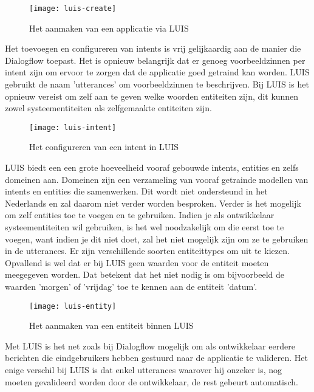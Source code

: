 \begin{figure}[H]
    \label{fig:luis-create}
    \centering
    \texttt{[image: luis-create]}
    \caption{Het aanmaken van een applicatie via LUIS}
\end{figure}

Het toevoegen en configureren van intents is vrij gelijkaardig aan de manier die Dialogflow toepast. Het is opnieuw belangrijk dat er genoeg voorbeeldzinnen per intent zijn om ervoor te zorgen dat de applicatie goed getraind kan worden. LUIS gebruikt de naam 'utterances' om voorbeeldzinnen te beschrijven. Bij LUIS is het opnieuw vereist om zelf aan te geven welke woorden entiteiten zijn, dit kunnen zowel systeementiteiten als zelfgemaakte entiteiten zijn.

\begin{figure}[H]
    \label{fig:luis-intent}
    \centering
    \texttt{[image: luis-intent]}
    \caption{Het configureren van een intent in LUIS}
\end{figure}

LUIS biedt een een grote hoeveelheid vooraf gebouwde intents, entities en zelfs domeinen aan. Domeinen zijn een verzameling van vooraf getrainde modellen van intents en entities die samenwerken. Dit wordt niet ondersteund in het Nederlands en zal daarom niet verder worden besproken. Verder is het mogelijk om zelf entities toe te voegen en te gebruiken. Indien je als ontwikkelaar systeementiteiten wil gebruiken, is het wel noodzakelijk om die eerst toe te voegen, want indien je dit niet doet, zal het niet mogelijk zijn om ze te gebruiken in de utterances. Er zijn verschillende soorten entiteittypes om uit te kiezen. Opvallend is wel dat er bij LUIS geen waarden voor de entiteit moeten meegegeven worden. Dat betekent dat het niet nodig is om bijvoorbeeld de waarden 'morgen' of 'vrijdag' toe te kennen aan de entiteit 'datum'.

\begin{figure}[H]
    \label{fig:luis-entity}
    \centering
    \texttt{[image: luis-entity]}
    \caption{Het aanmaken van een entiteit binnen LUIS}
\end{figure}

Met LUIS is het net zoals bij Dialogflow mogelijk om als ontwikkelaar eerdere berichten die eindgebruikers hebben gestuurd naar de applicatie te valideren. Het enige verschil bij LUIS is dat enkel utterances waarover hij onzeker is, nog moeten gevalideerd worden door de ontwikkelaar, de rest gebeurt automatisch.

